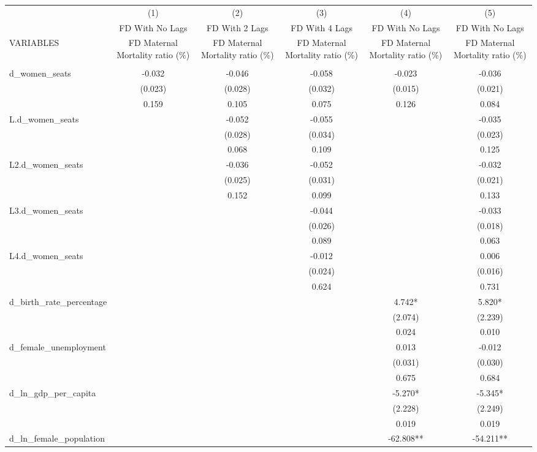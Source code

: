 \begin{tabular}{lccccc} \hline
 & (1) & (2) & (3) & (4) & (5) \\
 & FD With No Lags & FD With 2 Lags & FD With 4 Lags & FD With No Lags & FD With No Lags \\
VARIABLES & FD Maternal Mortality ratio (\%) & FD Maternal Mortality ratio (\%) & FD Maternal Mortality ratio (\%) & FD Maternal Mortality ratio (\%) & FD Maternal Mortality ratio (\%) \\ \hline
 &  &  &  &  &  \\
d\_women\_seats & -0.032 & -0.046 & -0.058 & -0.023 & -0.036 \\
 & (0.023) & (0.028) & (0.032) & (0.015) & (0.021) \\
 & 0.159 & 0.105 & 0.075 & 0.126 & 0.084 \\
L.d\_women\_seats &  & -0.052 & -0.055 &  & -0.035 \\
 &  & (0.028) & (0.034) &  & (0.023) \\
 &  & 0.068 & 0.109 &  & 0.125 \\
L2.d\_women\_seats &  & -0.036 & -0.052 &  & -0.032 \\
 &  & (0.025) & (0.031) &  & (0.021) \\
 &  & 0.152 & 0.099 &  & 0.133 \\
L3.d\_women\_seats &  &  & -0.044 &  & -0.033 \\
 &  &  & (0.026) &  & (0.018) \\
 &  &  & 0.089 &  & 0.063 \\
L4.d\_women\_seats &  &  & -0.012 &  & 0.006 \\
 &  &  & (0.024) &  & (0.016) \\
 &  &  & 0.624 &  & 0.731 \\
d\_birth\_rate\_percentage &  &  &  & 4.742* & 5.820* \\
 &  &  &  & (2.074) & (2.239) \\
 &  &  &  & 0.024 & 0.010 \\
d\_female\_unemployment &  &  &  & 0.013 & -0.012 \\
 &  &  &  & (0.031) & (0.030) \\
 &  &  &  & 0.675 & 0.684 \\
d\_ln\_gdp\_per\_capita &  &  &  & -5.270* & -5.345* \\
 &  &  &  & (2.228) & (2.249) \\
 &  &  &  & 0.019 & 0.019 \\
d\_ln\_female\_population &  &  &  & -62.808** & -54.211** \\

\end{tabular}
